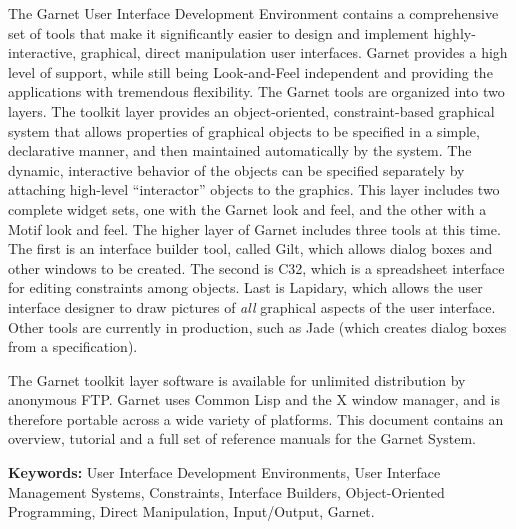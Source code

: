 \newpage
{}
\vspace{3 in}
\begin{center}
\end{center}
\begin{text}
The Garnet User Interface Development Environment contains a comprehensive
set of tools that make it significantly easier to design and implement
highly-interactive, graphical, direct manipulation user interfaces.
Garnet provides a high level of support, while still being
Look-and-Feel independent and providing the applications with tremendous
flexibility.  The Garnet tools are organized into two layers.
The toolkit layer provides an object-oriented, constraint-based
graphical system that allows properties of graphical objects to be
specified in a simple, declarative manner, and then maintained automatically
by the system.  The dynamic, interactive behavior of the objects can be
specified separately by attaching high-level ``interactor'' objects to the
graphics.  This layer includes two complete widget sets, one with the
Garnet look and feel, and the other with a Motif look and feel.
The higher layer of Garnet includes three tools at this time.  The first
is an interface builder tool, called Gilt, which allows dialog boxes and other
windows to be created.  The second is C32, which is a spreadsheet interface
for editing constraints among objects.
Last is Lapidary, which allows the user interface designer to
draw pictures of {\it all} graphical aspects of the user interface.  Other tools
are currently in production, such as Jade (which creates
dialog boxes from a specification).

The Garnet toolkit layer software is available for unlimited
distribution by anonymous FTP.  Garnet uses
Common Lisp and the X window manager, and is therefore portable across a
wide variety of platforms.  This document contains an overview, tutorial
and a full set of reference manuals for the Garnet System.
\end{text}

\vspace{1 inch}
{\bf Keywords:}  User Interface Development Environments, User
Interface Management Systems, Constraints, Interface Builders,
Object-Oriented Programming, Direct Manipulation, Input/Output, Garnet.


\newpage
{}
\vspace{0.25 inch}


